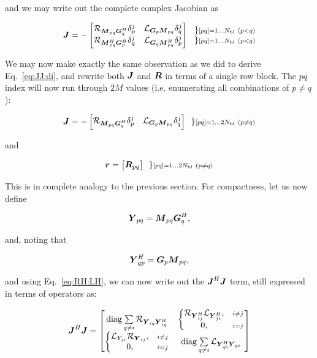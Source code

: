 \documentclass[useAMS,usenatbib]{mn2e}
\newcommand{\mat}[1]{{\bmath{#1}}}
\newcommand{\JJ}{\mat{J}} %
\newcommand{\MM}{\mat{M}}
\newcommand{\GG}{\mat{G}}
\newcommand{\JHJ}{\JJ^H\JJ} %
\begin{document}
and we may write out the complete complex Jacobian as

\[
\JJ = - \Matrix{cc}{ 
\Rop{ \MM_{pq}\GG^H_q }\delta^j_p & 
\Lop{ \GG_p \MM_{pq}  }\delta^j_q \\
\Rop{ \MM^H_{pq} \GG^H_p } \delta^j_q & 
\Lop{ \GG_q \MM^H_{pq}  } \delta^j_p  
}~~ 
\Stack{ 
\} \scriptstyle [pq]=1\dots \Nbl~(p<q) \\ 
\} \scriptstyle [pq]=1\dots \Nbl~(p<q) 
}
\]

We may now make exactly the same observation as we did to derive Eq.~\ref{eq:JJ:di}, and rewrite both $\JJ$ and $\bmath{R}$ in terms of 
a single row block. The $pq$ index will now run through $2M$ values (i.e. enumerating all combinations of $p\ne q$):

\begin{equation}
\label{eq:JJ:pol}
\JJ = - \Matrix{cc}{ 
\Rop{ \MM_{pq}\GG^H_q }\delta^j_p & 
\Lop{ \GG_p \MM_{pq}  }\delta^j_q \\
}~~ 
\} \scriptstyle [pq]=1\dots 2\Nbl~(p\ne q)\\ 
\end{equation}

and 

\begin{equation}
\bmath{r} = \Matrix{c}{ \mat{R}_{pq}}~~ 
\} \scriptstyle [pq]=1\dots 2\Nbl~(p\ne q)\\ 
\end{equation}

This is in complete analogy to the previous section. For compactness, let us now define

\newcommand{\YY}{\mat{Y}}
\newcommand{\ZZ}{\mat{Z}}
\[
\YY_{pq} = \MM_{pq} \GG^H_q,
\]

and, noting that 

\[
\YY_{qp}^H = \GG_p \MM_{pq},
\]

and using Eq.~\ref{eq:RH:LH}, we can now write out the $\JHJ$ term, still expressed in terms of 
operators
as:

\begin{equation}
\label{eq:JHJ:pol}
\JHJ = \Matrix{cc}{
  \mathrm{diag}\sum\limits_{q\ne i} \Rop{\YY_{iq} \YY^H_{iq}} & 
  \left \{ 
  \begin{array}{@{}cc@{}}
   \Rop{ \YY^H_{ij}  } \Lop{\YY^H_{ji}},&{\scriptstyle i\ne j} \\
   0, &{\scriptstyle i=j}
  \end{array} \right . 
  \\
  \left \{ 
  \begin{array}{@{}cc@{}}
   \Lop{ Y_{ji}  } \Rop{\YY_{ij}},&{\scriptstyle i\ne j} \\
   0, &{\scriptstyle i=j}
  \end{array} \right . 
  &
  \mathrm{diag}\sum\limits_{q\ne i} \Lop{\YY^H_{qi}\YY_{qi}}
}
\end{equation}
\end{document}
